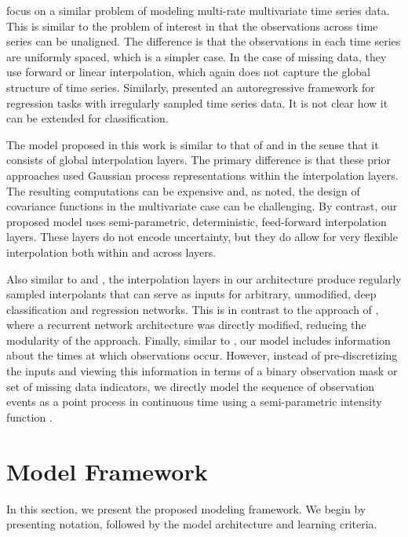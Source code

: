 \documentclass{article} \usepackage{iclr2019_conference,times}
\begin{document}
\cite{che18a} focus on a similar problem of modeling multi-rate multivariate time series data.  This is similar to the problem of interest in that the observations across time series can be unaligned. The difference is that the observations in each time series are uniformly spaced, which is a simpler case. In the case of missing data, they use forward or linear interpolation, which again does not capture the global structure of time series.  Similarly, \cite{auto_cnn} presented an autoregressive framework for regression tasks with irregularly sampled time series data. It is not clear how it can be extended for classification. 

The model proposed in this work is similar to that of \cite{li2016scalable}
and \cite{futoma2017improved} in the sense that it consists of global
interpolation layers. The primary difference is that these prior approaches 
used Gaussian process representations within the interpolation layers.
The resulting computations can be expensive and, as noted, the design of 
covariance functions in the multivariate case can be challenging. By contrast,
our proposed model uses semi-parametric, deterministic, feed-forward interpolation
layers. These layers do not encode uncertainty, but they do allow for
very flexible interpolation both within and across layers. 

Also similar to \cite{li2016scalable} and \cite{futoma2017improved}, the interpolation
layers in our architecture produce regularly sampled interpolants that can 
serve as inputs for arbitrary, unmodified, deep classification and
regression networks. This is in contrast to the approach of 
\citet{che2016recurrent}, where a recurrent network architecture was directly 
modified, reducing the modularity of the approach. 
Finally, similar to \cite{lipton2016directly}, our model includes information
about the times at which observations occur. However, instead of pre-discretizing
the inputs and viewing this information in terms of a binary observation mask
or set of missing data indicators, we directly model the sequence of
observation events as a point process in continuous time 
using a semi-parametric intensity function
\citep{lasko2014efficient}.

 
 

\section{Model Framework}

In this section, we present the proposed modeling framework. We begin by presenting notation, 
followed by the model architecture and learning criteria.
\end{document}
